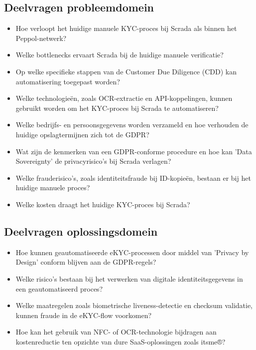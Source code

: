 \subsection{Deelvragen probleemdomein} 
\begin{itemize}
    \item {{Hoe verloopt het huidige manuele KYC-proces bij Scrada als binnen het Peppol-netwerk?}}
    \item {{Welke bottlenecks ervaart Scrada bij de huidige manuele verificatie?}}
    \item {{Op welke specifieke stappen van de Customer Due Diligence (CDD) kan automatisering toegepast worden?}}
    \item {{Welke technologieën, zoals OCR-extractie en API-koppelingen, kunnen gebruikt worden om het KYC-proces bij Scrada te automatiseren?}}
    \item {{Welke bedrijfs- en persoonsgegevens worden verzameld en hoe verhouden de huidige opslagtermijnen zich tot de GDPR?}}
    \item {{Wat zijn de kenmerken van een GDPR-conforme procedure en hoe kan 'Data Sovereignty' de privacyrisico's bij Scrada verlagen?}}
    \item {{Welke frauderisico’s, zoals identiteitsfraude bij ID-kopieën, bestaan er bij het huidige manuele proces?}}
    \item {{Welke kosten draagt het huidige KYC-proces bij Scrada?}}
\end{itemize}

\subsection{Deelvragen oplossingsdomein} 
\begin{itemize}
    \item {{Hoe kunnen geautomatiseerde eKYC-processen door middel van 'Privacy by Design' conform blijven aan de GDPR-regels?}}
    \item {{Welke risico’s bestaan bij het verwerken van digitale identiteitsgegevens in een geautomatiseerd proces?}}
    \item {{Welke maatregelen zoals biometrische liveness-detectie en checksum validatie, kunnen fraude in de eKYC-flow voorkomen?}}
    \item {{Hoe kan het gebruik van NFC- of OCR-technologie bijdragen aan kostenreductie ten opzichte van dure SaaS-oplossingen zoals itsme®?}}
\end{itemize}

